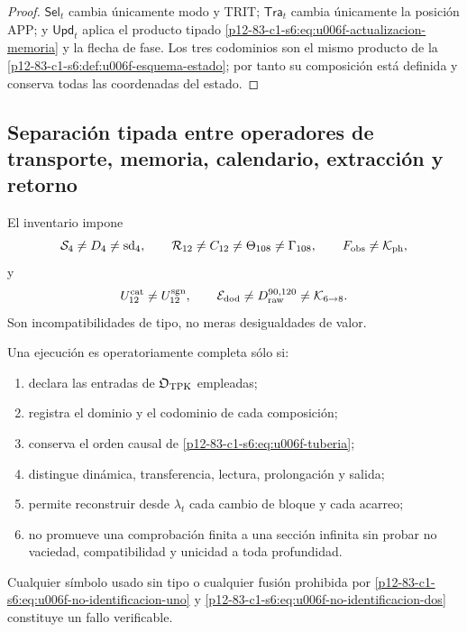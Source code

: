 {\begin{proof}
\(\mathsf{Sel}_t\) cambia únicamente modo y TRIT;
\(\mathsf{Tra}_t\) cambia únicamente la posición APP; y
\(\mathsf{Upd}_t\) aplica el producto tipado
\eqref{p12-83-c1-s6:eq:u006f-actualizacion-memoria} y la flecha de fase. Los tres
codominios son el mismo producto de la
\cref{p12-83-c1-s6:def:u006f-esquema-estado}; por tanto su composición está definida y
conserva todas las coordenadas del estado.
\end{proof}

\subsection{Separación tipada entre operadores de transporte, memoria, calendario, extracción y retorno}

El inventario impone
\begin{equation}
 \mathcal S_4\neq D_4\neq\operatorname{sd}_4,
 \qquad
 \mathcal R_{12}\neq C_{12}\neq\Theta_{108}\neq\Gamma_{108},
 \qquad
 F_{\rm obs}\neq\mathcal K_{\rm ph},
 \label{p12-83-c1-s6:eq:u006f-no-identificacion-uno}
\end{equation}
y
\begin{equation}
 U_{12}^{\rm cat}\neq U_{12}^{\rm sgn},
 \qquad
 \mathcal E_{\rm dod}\neq D_{\rm raw}^{90,120}
 \neq\mathcal K_{6\to8}.
 \label{p12-83-c1-s6:eq:u006f-no-identificacion-dos}
\end{equation}
Son incompatibilidades de tipo, no meras desigualdades de valor.

\begin{criterion}
\label{p12-83-c1-s6:crit:u006f-completitud}
Una ejecución es operatoriamente completa sólo si:
\begin{enumerate}
 \item declara las entradas de \(\mathfrak O_{\rm TPK}\) empleadas;
 \item registra el dominio y el codominio de cada composición;
 \item conserva el orden causal de \eqref{p12-83-c1-s6:eq:u006f-tuberia};
 \item distingue dinámica, transferencia, lectura, prolongación y salida;
 \item permite reconstruir desde \(\lambda_t\) cada cambio de bloque y
 cada acarreo;
 \item no promueve una comprobación finita a una sección infinita sin
 probar no vaciedad, compatibilidad y unicidad a toda profundidad.
\end{enumerate}
Cualquier símbolo usado sin tipo o cualquier fusión prohibida por
\eqref{p12-83-c1-s6:eq:u006f-no-identificacion-uno} y
\eqref{p12-83-c1-s6:eq:u006f-no-identificacion-dos} constituye un fallo verificable.
\end{criterion}


}
